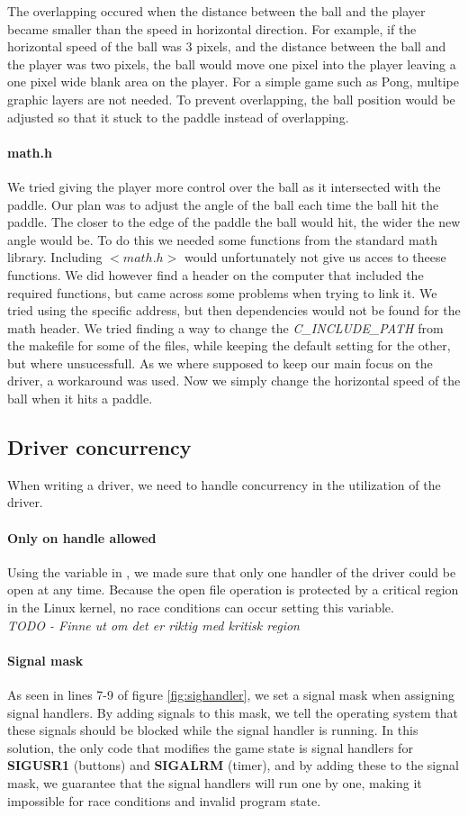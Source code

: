 The overlapping occured when the distance between the ball and the player became smaller than the speed in horizontal direction. For example, if the horizontal speed of the ball was 3 pixels, and the distance between the ball and the player was two pixels, the ball would move one pixel into the player leaving a one pixel wide blank area on the player. For a simple game such as Pong, multipe graphic layers are not needed. To prevent overlapping, the ball position would be adjusted so that it stuck to the paddle instead of overlapping. 
\paragraph{math.h}We tried giving the player more control over the ball as it intersected with the paddle. Our plan was to adjust the angle of the ball each time the ball hit the paddle. The closer to the edge of the paddle the ball would hit, the wider the new angle would be. To do this we needed some functions from the standard math library. Including $<math.h>$ would unfortunately not give us acces to theese functions. We did however find a header on the computer that included the required functions, but came across some problems when trying to link it. We tried using the specific address, but then dependencies would not be found for the math header. We tried finding a way to change the \emph{C\_INCLUDE\_PATH} from the makefile for some of the files, while keeping the default setting for the other, but where unsucessfull. As we where supposed to keep our main focus on the driver, a workaround was used. Now we simply change the horizontal speed of the ball when it hits a paddle. 

\subsection{Driver concurrency}
When writing a driver, we need to handle concurrency in the utilization of the driver.
\paragraph{Only on handle allowed}
Using the  variable in , we made sure that only one handler of the driver could be open at any time. Because the open file operation is protected by a critical region in the Linux kernel, no race conditions can occur setting this variable.\\
\emph{TODO - Finne ut om det er riktig med kritisk region}
\paragraph{Signal mask}
As seen in lines 7-9 of figure \ref{fig:sighandler}, we set a signal mask when assigning signal handlers. By adding signals to this mask, we tell the operating system that these signals should be blocked while the signal handler is running. In this solution, the only code that modifies the game state is signal handlers for \textbf{SIGUSR1} (buttons) and \textbf{SIGALRM} (timer), and by adding these to the signal mask, we guarantee that the signal handlers will run one by one, making it impossible for race conditions and invalid program state.


